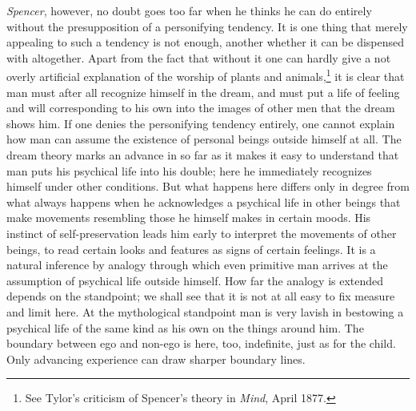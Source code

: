 \documentclass[12pt,a4paper]{book}
\begin{document}
\emph{Spencer}, however, no doubt goes too far when he thinks he can do
entirely without the presupposition of a personifying tendency. It is
one thing that merely appealing to such a tendency is not enough, another
whether it can be dispensed with altogether. Apart from the fact that
without it one can hardly give a not overly artificial explanation of
the worship of plants and
animals,\footnote{See Tylor's criticism of Spencer's theory in
\textit{Mind}, April 1877.} it is clear that man must after all recognize
himself in the dream, and must put a life of feeling and will
corresponding to his own into the images of other men that the dream
shows him. If one denies the personifying tendency entirely, one cannot
explain how man can assume the existence of personal beings outside
himself at all. The dream theory marks an advance in so far as it makes
it easy to understand that man puts his psychical life into his double;
here he immediately recognizes himself under other conditions. But what
happens here differs only in degree from what always happens when he
acknowledges a psychical life in other beings that make movements
resembling those he himself makes in certain moods. His instinct of
self-preservation leads him early to interpret the movements of other
beings, to read certain looks and features as signs of certain feelings.
It is a natural inference by analogy through which even primitive man
arrives at the assumption of psychical life outside himself. How far
the analogy is extended depends on the standpoint; we shall see that it
is not at all easy to fix measure and limit here. At the mythological
standpoint man is very lavish in bestowing a psychical life of the same
kind as his own on the things around him. The boundary between ego and
non-ego is here, too, indefinite, just as for the child. Only advancing
experience can draw sharper boundary lines.
\end{document}
